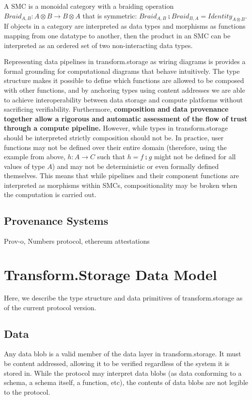 \documentclass[9pt, oneside]{article}   	%
\begin{document}
\begin{multicols}{2}
A SMC is a monoidal category with a braiding operation $Braid_{A,B} : A \otimes B \rightarrow B \otimes A$ that is symmetric: $Braid_{A,B} \zcmp Braid_{B,A}=Identity_{A \otimes B}$. If objects in a category are interpreted as data types and morphisms as functions mapping from one datatype to another, then the product in an SMC can be interpreted as an ordered set of two non-interacting data types. 

Representing data pipelines in transform.storage as wiring diagrams is provides a formal grounding for computational diagrams that behave intuitively. The type structure makes it possible to define which functions are allowed to be composed with other functions, and by anchoring types using content addresses we are able to achieve interoperability between data storage and compute platforms without sacrificing verifiability. Furthermore, \textbf{composition and data provenance together allow a rigorous and automatic assessment of the flow of trust through a compute pipeline.}  However, while types in transform.storage should be interpreted strictly composition should not be. In practice, user functions may not be defined over their entire domain (therefore, using the example from above, $h : A \rightarrow C$ such that $h = f \zcmp g$ might not be defined for all values of type $A$) and may not be deterministic or even formally defined themselves. This means that while pipelines and their component functions are interpreted as morphisms within SMCs, compositionality may be broken when the computation is carried out. 


\subsection{Provenance Systems}\label{smc}
Prov-o, Numbers protocol, ethereum attestations 

\section{Transform.Storage Data Model}\label{transformtypes}

Here, we describe the type structure and data primitives of transform.storage as of the current protocol version.

\subsection{Data}\label{data}

Any data blob is a valid member of the data layer in transform.storage. It must be content addressed, allowing it to be verified regardless of the system it is stored in. While the protocol may interpret data blobs (as data conforming to a schema, a schema itself, a function, etc), the contents of data blobs are not legible to the protocol.


\end{multicols}
\end{document}
